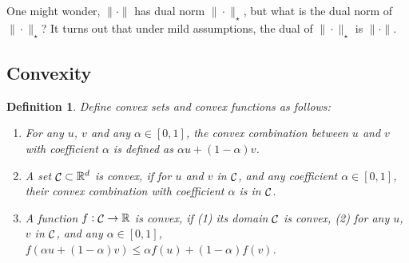 \documentclass{article}
\newtheorem{example}{Example}
\newtheorem{definition}{Definition}
\DeclareMathOperator*{\ope}{{\rm op}}
\DeclareMathOperator*{\Ccal}{{\cal C}}
\newcommand{\RR}{\mathbb{R}} %
\begin{document}
One might wonder, $\| \cdot\|$ has dual norm $\| \cdot\|_\star$, but
what is the dual norm of $\| \cdot\|_\star$? It turns out that under mild assumptions, the dual of $\|\cdot \|_\star$ is $\|\cdot \|$.



\subsection{Convexity}

\begin{definition}
Define convex sets and convex functions as follows:
\begin{enumerate}
\item For any $u$, $v$ and any $\alpha \in [0,1]$, the {\em convex combination} between $u$ and $v$ with coefficient $\alpha$ is defined as $\alpha u + (1-\alpha) v$.

\item A set $\Ccal \subset \RR^d$ is {\em convex}, if for $u$ and $v$ in $\Ccal$, and any coefficient $\alpha \in [0,1]$, their convex combination with coefficient $\alpha$ is in $\Ccal$.

\item A function $f: \Ccal \to \RR$ is {\em convex}, if (1) its domain $\Ccal$ is convex, (2) for any $u$, $v$ in $\Ccal$, and any $\alpha \in [0,1]$, $f(\alpha u + (1-\alpha)v) \leq \alpha f(u) + (1-\alpha) f(v)$.
\end{enumerate}
\end{definition}
\end{document}

